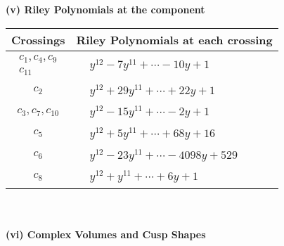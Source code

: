 \documentclass[1p]{elsarticle_modified}
\theoremstyle{definition}
\begin{document}
\newpage\renewcommand{\arraystretch}{1}
\flushleft \textbf{(v) Riley Polynomials at the component}\newline \\
\begin{tabular}{m{50pt}|m{274pt}}
Crossings & \hspace{64pt}Riley Polynomials at each crossing \\
\hline $$\begin{aligned}c_{1},c_{4},c_{9}\\c_{11}\end{aligned}$$&$\begin{aligned}
&y^{12}-7 y^{11}+\cdots-10 y+1
\end{aligned}$\\
\hline $$\begin{aligned}c_{2}\end{aligned}$$&$\begin{aligned}
&y^{12}+29 y^{11}+\cdots+22 y+1
\end{aligned}$\\
\hline $$\begin{aligned}c_{3},c_{7},c_{10}\end{aligned}$$&$\begin{aligned}
&y^{12}-15 y^{11}+\cdots-2 y+1
\end{aligned}$\\
\hline $$\begin{aligned}c_{5}\end{aligned}$$&$\begin{aligned}
&y^{12}+5 y^{11}+\cdots+68 y+16
\end{aligned}$\\
\hline $$\begin{aligned}c_{6}\end{aligned}$$&$\begin{aligned}
&y^{12}-23 y^{11}+\cdots-4098 y+529
\end{aligned}$\\
\hline $$\begin{aligned}c_{8}\end{aligned}$$&$\begin{aligned}
&y^{12}+y^{11}+\cdots+6 y+1
\end{aligned}$\\
\hline
\end{tabular}\\~\\
\newpage\flushleft \textbf{(vi) Complex Volumes and Cusp Shapes}
\end{document}
